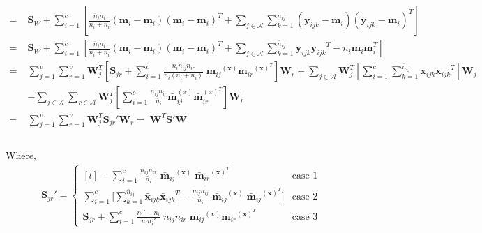 \begin{equation*}
\begin{split}
\\
= \; & \textbf{S}_W + \sum_{i=1}^{c} \left[ \frac{\bar{n}_i n_i}{n_i + \bar{n}_i} \left( \bar{\textbf{m}}_i -\textbf{m}_i \right) \left( \bar{\textbf{m}}_i -\textbf{m}_i \right)^T + \sum_{j \in \mathcal{A}} \sum_{k=1}^{\bar{n}_{ij}} \left( \bar{\textbf{y}}_{ijk} - \bar{\textbf{m}}_i \right) \left( \bar{\textbf{y}}_{ijk} - \bar{\textbf{m}}_i \right)^T \right]
\\
= \; & \textbf{S}_W + \sum_{i=1}^{c} \left[ \frac{\bar{n}_i n_i}{n_i + \bar{n}_i} \left( \bar{\textbf{m}}_i -\textbf{m}_i \right) \left( \bar{\textbf{m}}_i -\textbf{m}_i \right)^T + \sum_{j \in \mathcal{A}} \sum_{k=1}^{\bar{n}_{ij}} \bar{\textbf{y}}_{ijk} {\bar{\textbf{y}}_{ijk}}^T - \bar{n}_i \bar{\textbf{m}}_i \bar{\textbf{m}}_i^T \right]
\\
= \; & \sum_{j=1}^{v} \sum_{r=1}^{v} \textbf{W}_j^T \left[ \textbf{S}_{jr} + \sum_{i=1}^{c} \frac{\bar{n}_i n_{ij} n_{ir}}{n_i (n_i + \bar{n}_i)} \; {\textbf{m}_{ij}}^{(\textbf{x})} {\textbf{m}_{ir}}^{(\textbf{x})^T} \right] \textbf{W}_r + \sum_{j \in \mathcal{A}} \textbf{W}_j^T \left[ \sum_{i=1}^{c} \sum_{k=1}^{\bar{n}_{ij}} \bar{\textbf{x}}_{ijk} {\bar{\textbf{x}}_{ijk}}^T \right] \textbf{W}_j
\\
& - \sum_{j \in \mathcal{A}} \sum_{r \in \mathcal{A}} \textbf{W}_j^T \left[ \sum_{i=1}^{c} \frac{\bar{n}_{ij} \bar{n}_{ir}}{\bar{n}_i} \bar{\textbf{m}}_{ij}^{(x)} \bar{\textbf{m}}_{ir}^{(x)^T} \right] \textbf{W}_r
\\
= & \sum_{j=1}^{v} \sum_{r=1}^{v} \textbf{W}_j^T \textbf{S}_{jr}' \textbf{W}_r = \; \textbf{W}^T \textbf{S}' \textbf{W} \\
\end{split}
\end{equation*}
\\
Where,\\
\begin{equation*}
\begin{split}
\textbf{S}_{jr}' = \left\{\begin{matrix*}[l]
- \sum\limits_{i=1}^{c} \frac{\bar{n}_{ij} \bar{n}_{ir}}{\bar{n}_i} \; {\bar{\textbf{m}}_{ij}}^{(\textbf{x})} \; {\bar{\textbf{m}}_{ir}}^{(\textbf{x})^T} & \text{case 1}
\\[0.4cm]
\sum\limits_{i=1}^{c} \bigg[ \sum\limits_{k=1}^{\bar{n}_{ij}} \bar{\textbf{x}}_{ijk} {\bar{\textbf{x}}_{ijk}}^T - \frac{\bar{n}_{ij} \bar{n}_{ij}}{\bar{n}_i} \; {\bar{\textbf{m}}_{ij}}^{(\textbf{x})} \;{\bar{\textbf{m}}_{ij}}^{(\textbf{x})^T} \bigg] & \text{case 2}
\\[0.4cm]
\textbf{S}_{jr} + \sum\limits_{i=1}^{c}  \frac{n_i' - n_i}{n_i n_i'} \; n_{ij} n_{ir} \; {\textbf{m}_{ij}}^{(\textbf{x})} {\textbf{m}_{ir}}^{(\textbf{x})^T} & \text{case 3}
\end{matrix*}\right.
\end{split}
\end{equation*}



\chapterend
\cleardoublepage
